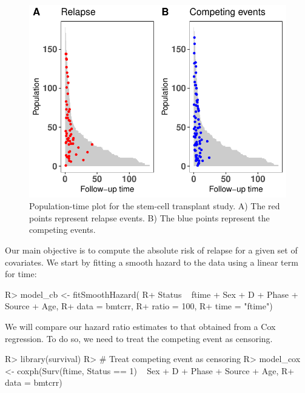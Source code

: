\documentclass[
]{jss}
\begin{document}
\begin{CodeChunk}
\begin{figure}

{\centering \includegraphics{../figures/compPop-1} 

}

\caption[Population-time plot for the stem-cell transplant study]{Population-time plot for the stem-cell transplant study. A) The red points represent relapse events. B) The blue points represent the competing events.}\label{fig:compPop}
\end{figure}
\end{CodeChunk}

Our main objective is to compute the absolute risk of relapse for a
given set of covariates. We start by fitting a smooth hazard to the data
using a linear term for time:

\begin{CodeChunk}

\begin{CodeInput}
R> model_cb <- fitSmoothHazard(
R+     Status ~ ftime + Sex + D + Phase + Source + Age, 
R+     data = bmtcrr, 
R+     ratio = 100, 
R+     time = "ftime")
\end{CodeInput}
\end{CodeChunk}

We will compare our hazard ratio estimates to that obtained from a Cox
regression. To do so, we need to treat the competing event as censoring.

\begin{CodeChunk}

\begin{CodeInput}
R> library(survival)
R> # Treat competing event as censoring
R> model_cox <- coxph(Surv(ftime, Status == 1) ~ Sex + D + Phase + Source + Age,
R+                    data = bmtcrr)
\end{CodeInput}
\end{CodeChunk}
\end{document}
